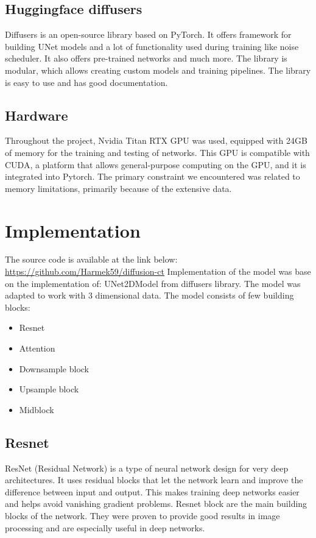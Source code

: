 \documentclass[11pt,a4paper]{report}
\begin{document}
\subsection{Huggingface diffusers}
Diffusers is an open-source library based on PyTorch. It offers framework for building UNet models and a lot of functionality used during training like noise scheduler. It also offers pre-trained networks and much more. The library is modular, which allows creating custom models and training pipelines. The library is easy to use and has good documentation. \cite{Hf_diffusers}
\subsection{Hardware}
Throughout the project, Nvidia Titan RTX GPU was used, equipped with 24GB of memory for the training and testing of networks. This GPU is compatible with CUDA, a platform that allows general-purpose computing on the GPU, and it is integrated into Pytorch. The primary constraint we encountered was related to memory limitations, primarily because of the extensive data.
\section{Implementation}
The source code is available at the link below:
\newline
\url{https://github.com/Harmek59/diffusion-ct}
\newline
Implementation of the model was base on the implementation of: UNet2DModel from diffusers library. The model was adapted to work with 3 dimensional data.
The model consists of few building blocks:
\begin{itemize}
\item Resnet
\item Attention
\item Downsample block
\item Upsample block
\item Midblock
\end{itemize}
\subsection{Resnet}
ResNet (Residual Network) is a type of neural network design for very deep architectures. It uses residual blocks that let the network learn and improve the difference between input and output. This makes training deep networks easier and helps avoid vanishing gradient problems. \cite{Resnet} Resnet block are the main building blocks of the network. They were proven to provide good results in image processing and are especially useful in deep networks.
\end{document}
